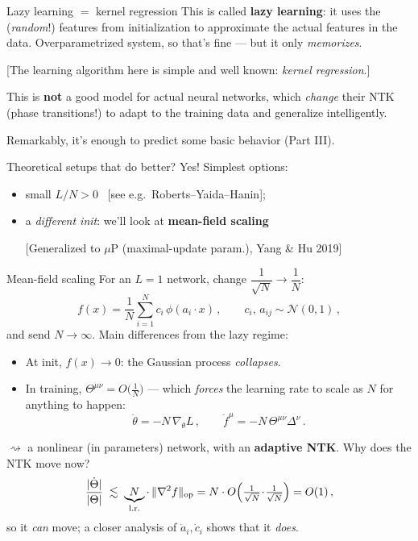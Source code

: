 \documentclass[11pt]{beamer}
\newcommand{\hl}[1]{{\color{blue!60!black}\textbf{#1}}}
\begin{document}
\begin{frame}{Lazy learning $=$ kernel regression}
  This is called \hl{lazy learning}: it uses the (\emph{random}!)
  features from initialization to approximate the actual features in the
  data. Overparametrized system, so that's fine --- but it only
  \emph{memorizes}.
  \vspace{1mm}

  {\footnotesize [The learning algorithm here is simple and well known:
  \emph{kernel regression}.]}
  \vspace{4mm}

  This is \hl{not} a good model for actual neural networks, which
  \emph{change} their NTK (phase transitions!) to adapt to the training
  data and generalize intelligently.
  
  Remarkably, it's enough to predict some basic behavior (Part III).
  
  \vspace{3mm}

  Theoretical setups that do better? Yes! Simplest options:
  \begin{itemize}
    \item small $L/N > 0$ \ [see e.g.\ Roberts--Yaida--Hanin];
    \item a \emph{different init}: we'll look at \hl{mean-field
      scaling}
      
      \smallskip
      {\footnotesize[Generalized to $\mu$P (maximal-update
      param.), Yang \& Hu 2019]}
  \end{itemize}
\end{frame}

\begin{frame}{Mean-field scaling}
  For an $L=1$ network, change $\dfrac{1}{\sqrt N} \to \dfrac1N$:
  \[
    f(x) = \frac1N \sum_{i=1}^N c_i\,\phi(a_i\cdot x)\,,\qquad
    c_i,\, a_{ij} \sim \mathcal N(0,1)\,,
  \]
  and send $N\to\infty$. Main differences from the lazy regime:
  \begin{itemize}
    \item At init, $f(x) \to 0$: the Gaussian process \emph{collapses}.
    \item In training, $\Theta^{\mu\nu} = O\big(\tfrac1N\big)$ ---
      which \emph{forces} the learning rate to scale as $N$ for anything to happen:
      \[
        \dot\theta = -N\,\nabla_\theta L\,,\qquad
        \dot f^\mu = -N\,\Theta^{\mu\nu}\Delta^\nu\,.
      \]
  \end{itemize}
  $\rightsquigarrow$ a nonlinear (in parameters) network, with an
  \hl{adaptive NTK}. Why does the NTK move now?
  \[
    \frac{|\dot\Theta|}{|\Theta|} \;\lesssim\;
    \underbrace{N}_{\text{l.r.}}\cdot\,
    \|\nabla^2 f\|_{\rm op}
    = N\cdot O\Big(\tfrac{1}{\sqrt N}\!\cdot\!\tfrac{1}{\sqrt N}\Big) = O(1)\,,
  \]
  so it \emph{can} move; a closer analysis of $\dot a_i, \dot c_i$ shows that it \emph{does}.
\end{frame}
\end{document}
